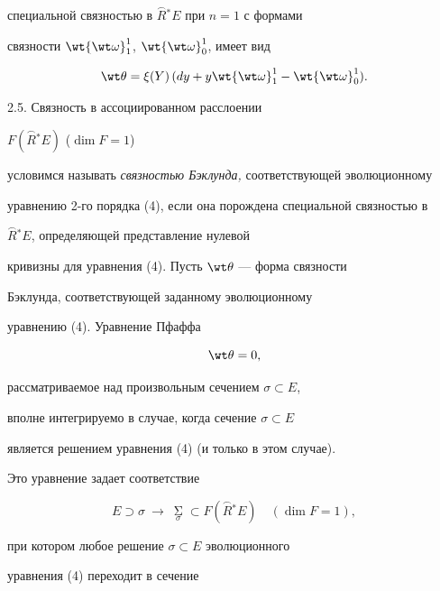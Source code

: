 специальной связностью в $\overset{\frown}{R}{}^ * E$ при $n=1$ с формами 


связности ${\wt{\wt\omega}}_1^1$, ${\wt{\wt \omega}}_0^1$, имеет вид


\begin{equation}


{\wt \theta}=\xi (Y)\, ({dy+y{\wt{\wt \omega}}_1^1-{\wt{\wt \omega}}_0^1}).


\end{equation}





2.5. Связность в ассоциированном расслоении


$F(\overset{\frown}{R}{}^ * E)$ (${\dim F=1}$)


условимся называть {\it связностью Бэклунда,} соответствующей эволюционному


уравнению 2-го порядка (4), если она порождена специальной связностью в


$\overset{\frown}{R}{}^*E$, определяющей представление нулевой 


кривизны для уравнения (4). Пусть $\wt \theta$ --- форма связности 


Бэклунда, соответствующей заданному эволюционному


уравнению (4). Уравнение Пфаффа


\begin{equation}


\wt \theta=0,


\end{equation}


рассматриваемое над произвольным сечением $\sigma \subset E$, 


вполне интегрируемо в случае, когда сечение $\sigma \subset E$ 


является решением уравнения (4) (и только в этом случае).


Это уравнение задает соответствие


\begin{equation}


E \supset \sigma \ \to \ \mathop{\Sigma}\limits_\sigma \subset


F (\overset{\frown}{R}{}^ * E)\quad ({\dim F=1}),


\end{equation}


при котором любое решение $\sigma \subset E$ эволюционного 


уравнения (4) переходит в сечение


